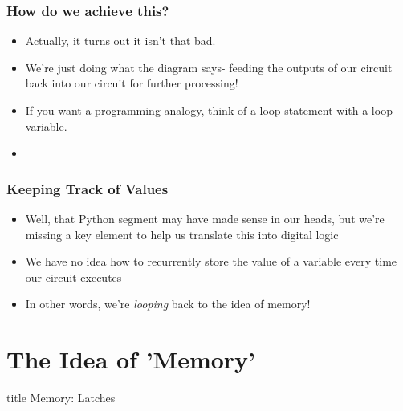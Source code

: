 \documentclass{beamer}
\begin{document}
   		\begin{frame}
   			\frametitle{How do we achieve this?}
   			\begin{itemize}
   				\item Actually, it turns out it isn't that bad.
   				\item We're just doing what the diagram says- feeding the outputs of our circuit back into our circuit for further processing!
   				\item If you want a programming analogy, think of a loop statement with a loop variable.
   				\item {
   			\centering
   			}
   			\end{itemize}
   		\end{frame}
   		
   		
   		\begin{frame}
   			\frametitle{Keeping Track of Values}
   			\begin{itemize}
   				\item Well, that Python segment may have made sense in our heads, but we're missing a key element to help us translate this into digital logic
   				\item We have no idea how to recurrently store the value of a variable every time our circuit executes
   				\item In other words, we're \textit{looping} back to the idea of memory!
   			\end{itemize}
   		\end{frame}
   		
   	
   	
   	\section{The Idea of 'Memory'}
   	
	\begin{frame}
                \vfill
                \centering
                \begin{beamercolorbox}[sep=8pt,center,shadow=true,rounded=true]{title}
                    Memory: Latches\par%
                \end{beamercolorbox}
                \vfill
             \end{frame}   	
   	
\end{document}
